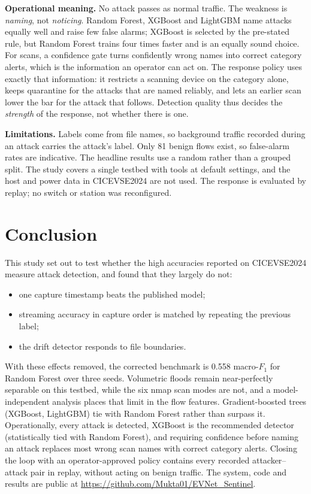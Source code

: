 \documentclass[conference]{IEEEtran}
\begin{document}
\textbf{Operational meaning.} No attack passes as normal traffic. The weakness is \emph{naming}, not \emph{noticing}. Random Forest, XGBoost and LightGBM name attacks equally well and raise few false alarms; XGBoost is selected by the pre-stated rule, but Random Forest trains four times faster and is an equally sound choice. For scans, a confidence gate turns confidently wrong names into correct category alerts, which is the information an operator can act on. The response policy uses exactly that information: it restricts a scanning device on the category alone, keeps quarantine for the attacks that are named reliably, and lets an earlier scan lower the bar for the attack that follows. Detection quality thus decides the \emph{strength} of the response, not whether there is one.

\textbf{Limitations.} Labels come from file names, so background traffic recorded during an attack carries the attack's label. Only 81 benign flows exist, so false-alarm rates are indicative. The headline results use a random rather than a grouped split. The study covers a single testbed with tools at default settings, and the host and power data in CICEVSE2024 are not used. The response is evaluated by replay; no switch or station was reconfigured.

\section{Conclusion}
\label{sec:conclusion}

This study set out to test whether the high accuracies reported on CICEVSE2024 measure attack detection, and found that they largely do not:
\begin{itemize}
    \item one capture timestamp beats the published model;
    \item streaming accuracy in capture order is matched by repeating the previous label;
    \item the drift detector responds to file boundaries.
\end{itemize}
With these effects removed, the corrected benchmark is 0.558 macro-$F_1$ for Random Forest over three seeds. Volumetric floods remain near-perfectly separable on this testbed, while the six nmap scan modes are not, and a model-independent analysis places that limit in the flow features. Gradient-boosted trees (XGBoost, LightGBM) tie with Random Forest rather than surpass it. Operationally, every attack is detected, XGBoost is the recommended detector (statistically tied with Random Forest), and requiring confidence before naming an attack replaces most wrong scan names with correct category alerts. Closing the loop with an operator-approved policy contains every recorded attacker--attack pair in replay, without acting on benign traffic. The system, code and results are public at \url{https://github.com/Mukta01/EVNet_Sentinel}.
\end{document}
